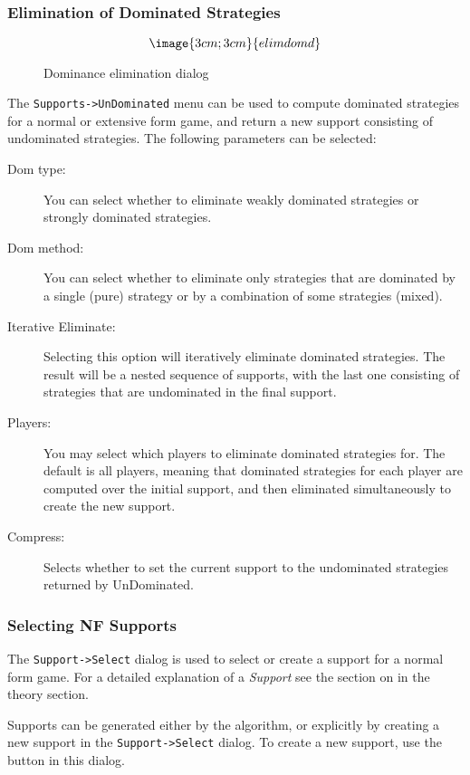 {\subsubsection{Elimination of Dominated Strategies}\label{UnDominated}
\begin{figure}
$$\image{3cm;3cm}{elimdomd}$$
\caption{Dominance elimination dialog}\label{fig_elimdomd}
\end{figure}

The {\tt Supports->UnDominated} menu can be used to compute dominated 
strategies for a normal or extensive form game, and return a new support 
consisting of undominated strategies.  
The following parameters can 
be selected:
\begin{description}
\item[Dom type:]  You can select whether to eliminate weakly dominated 
strategies or strongly dominated strategies.
\item[Dom method:] You can select whether to eliminate only strategies that are
dominated by a single (pure) strategy or by a combination of some strategies
(mixed).
\item[Iterative Eliminate:] Selecting this option will iteratively eliminate dominated strategies. The 
result will be a nested sequence of supports, with the last one consisting of 
strategies that are undominated in the final support.  
\item[Players:] You may select which players to eliminate dominated strategies for. The 
default is all players, meaning that dominated strategies for each player are computed 
over the initial support, and then eliminated simultaneously to create the new support.  
\item[Compress:] Selects whether to set the current support to the undominated 
strategies returned by UnDominated.  
\end{description}

\subsubsection{Selecting NF Supports}\label{UnDominatedInspect}

The {\tt Support->Select} dialog is used to select or create a support for 
a normal form game.  For a detailed explanation of a {\em Support} see 
the section on  in the theory section.

Supports can be generated either by the 
 algorithm, 
or explicitly by creating a new support in the {\tt Support->Select} dialog.  
To create a new support, use the  button in this 
dialog.  

}
